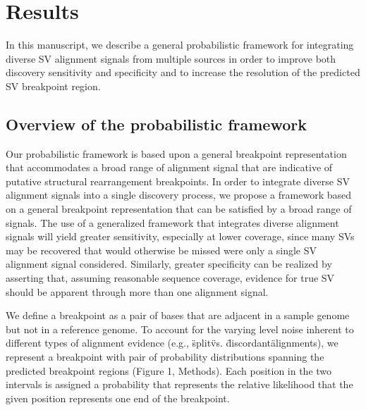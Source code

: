 \documentclass[11pt]{article}
\begin{document}
\section{Results}

In this manuscript, we describe a general probabilistic framework for 
integrating diverse SV alignment signals from multiple sources in order 
to improve both discovery sensitivity and specificity and to increase the 
resolution of the predicted SV breakpoint region.

\subsection{Overview of the probabilistic framework}

Our probabilistic framework is based upon a general breakpoint representation
that accommodates a broad range of alignment signal that are indicative of
putative structural rearrangement breakpoints. In order to integrate diverse 
SV alignment signals into a single discovery process, we propose a framework 
based on a general breakpoint representation that can be satisfied by a broad 
range of signals. The use of a generalized framework that integrates diverse 
alignment signals will yield greater sensitivity, especially at lower
coverage, since many SVs may be recovered that would otherwise be missed were
only a single SV alignment signal considered. Similarly, greater specificity
can be realized by asserting that, assuming reasonable sequence coverage, 
evidence for true SV should be apparent through more than one alignment signal.

We define a breakpoint as a pair of bases that are adjacent in a sample genome 
but not in a reference genome.  To account for the varying level noise inherent 
to different types of alignment evidence (e.g., \"split\" vs. \"discordant\" 
alignments), we represent a breakpoint with pair of probability distributions
spanning the predicted breakpoint regions (Figure 1, Methods).  Each position 
in the two intervals is assigned a probability that represents the relative 
likelihood that the given position represents one end of the breakpoint. 
\end{document}
